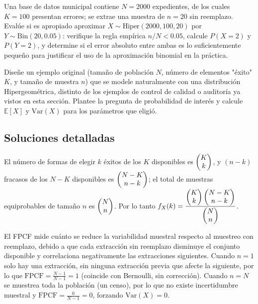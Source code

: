 \begin{problema}
	\label{prob:7cf587b}
	Una base de datos municipal contiene $N=2000$ expedientes, de los cuales $K=100$ presentan errores; se extrae una muestra de $n=20$ sin reemplazo. Evalúe si es apropiado aproximar $X\sim\text{Hiper}(2000,100,20)$ por $Y\sim\text{Bin}(20, 0.05)$: verifique la regla empírica $n/N<0.05$, calcule $P(X=2)$ y $P(Y=2)$, y determine si el error absoluto entre ambas es lo suficientemente pequeño para justificar el uso de la aproximación binomial en la práctica.
\end{problema}

\begin{problema}
	\label{prob:969b25a}
	Diseñe un ejemplo original (tamaño de población $N$, número de elementos "éxito" $K$, y tamaño de muestra $n$) que se modele naturalmente con una distribución Hipergeométrica, distinto de los ejemplos de control de calidad o auditoría ya vistos en esta sección. Plantee la pregunta de probabilidad de interés y calcule $\mathbb{E}[X]$ y $\text{Var}(X)$ para los parámetros que eligió.
\end{problema}

\subsection*{Soluciones detalladas}

\begin{solproblema}[prob:748a77d]
	El número de formas de elegir $k$ éxitos de los $K$ disponibles es $\begin{pmatrix} K \\ k\end{pmatrix}$, y $(n-k)$ fracasos de los $N-K$ disponibles es $\begin{pmatrix} N-K \\ n-k\end{pmatrix}$; el total de muestras equiprobables de tamaño $n$ es $\begin{pmatrix} N \\ n\end{pmatrix}$. Por lo tanto $f_X(k) = \dfrac{\begin{pmatrix} K \\ k\end{pmatrix}\begin{pmatrix} N-K \\ n-k\end{pmatrix}}{\begin{pmatrix} N \\ n\end{pmatrix}}$.
\end{solproblema}

\begin{solproblema}[prob:5e6e8bf]
	El FPCF mide cuánto se reduce la variabilidad muestral respecto al muestreo con reemplazo, debido a que cada extracción sin reemplazo disminuye el conjunto disponible y correlaciona negativamente las extracciones siguientes. Cuando $n=1$ solo hay una extracción, sin ninguna extracción previa que afecte la siguiente, por lo que $\text{FPCF}=\frac{N-1}{N-1}=1$ (coincide con Bernoulli, sin corrección). Cuando $n=N$ se muestrea toda la población (un censo), por lo que no existe incertidumbre muestral y $\text{FPCF}=\frac{0}{N-1}=0$, forzando $\text{Var}(X)=0$.
\end{solproblema}

